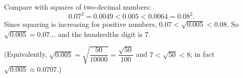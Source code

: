 Compare with squares of two-decimal numbers:
\[
0.07^2=0.0049<0.005<0.0064=0.08^2 .
\]
Since squaring is increasing for positive numbers, $0.07<\sqrt{0.005}<0.08$. So $\sqrt{0.005}=0.07\ldots$ and the hundredths digit is $\boxed{7}$.

(Equivalently, $\sqrt{0.005}=\sqrt{\dfrac{50}{10000}}=\dfrac{\sqrt{50}}{100}$ and $7<\sqrt{50}<8$; in fact $\sqrt{0.005}\approx0.0707$.)

